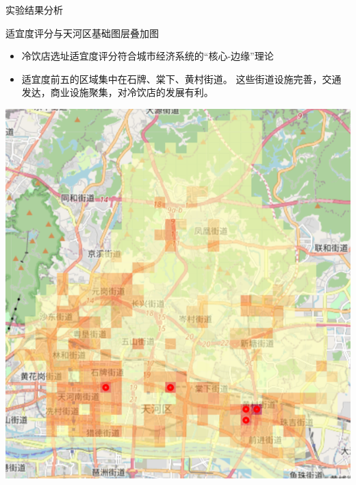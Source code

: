\documentclass{beamer}
\begin{document}
\begin{frame}{实验结果分析}
    \begin{minipage}{0.37\textwidth}
        适宜度评分与天河区基础图层叠加图
        \small
        \begin{itemize}
            \item 冷饮店选址适宜度评分符合城市经济系统的“核心-边缘”理论
            \item 适宜度前五的区域集中在石牌、棠下、黄村街道。
            这些街道设施完善，交通发达，商业设施聚集，对冷饮店的发展有利。
        \end{itemize}
  
      \end{minipage}
      \hfill
      \begin{minipage}{0.6\textwidth}
        \includegraphics[width=1\textwidth]{pic/result2.png}
      \end{minipage}
\end{frame}
\end{document}
